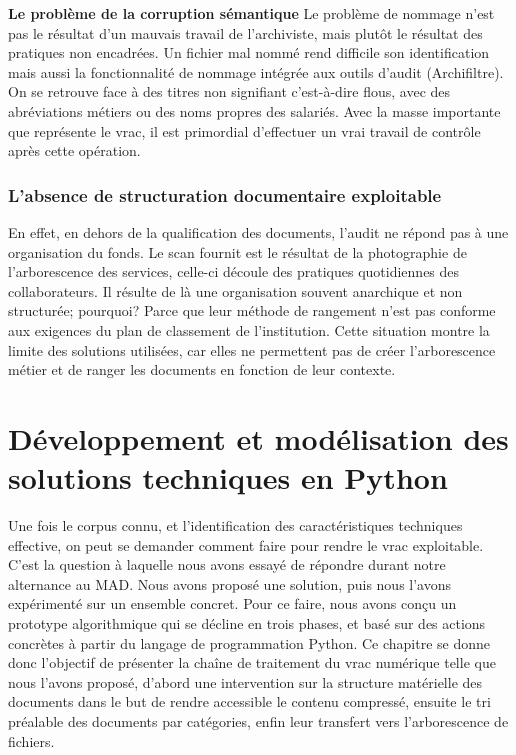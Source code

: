 \textbf{Le problème de la corruption sémantique}  Le problème de nommage n'est pas le résultat d'un mauvais travail de l'archiviste, mais plutôt le résultat des pratiques non encadrées. Un fichier mal nommé rend difficile son identification mais aussi la fonctionnalité de nommage intégrée aux outils d'audit (Archifiltre). On se retrouve face à des titres non signifiant c'est-à-dire flous, avec des abréviations métiers ou des noms propres des salariés. Avec la masse importante que représente le vrac, il est primordial d'effectuer un vrai travail de contrôle après cette opération. 


\subsection*{L’absence de structuration documentaire exploitable}

En effet, en dehors de la qualification des documents, l'audit ne répond pas à une organisation du fonds. Le scan fournit est le résultat de la photographie de l'arborescence des services, celle-ci découle des pratiques quotidiennes des collaborateurs. Il résulte de là une organisation souvent anarchique et non structurée; pourquoi? Parce que leur méthode de rangement n'est pas conforme aux exigences du plan de classement de l'institution. Cette situation montre la limite des solutions utilisées, car elles ne permettent pas de créer l'arborescence métier et de ranger les documents en fonction de leur contexte.



\chapter{Développement et modélisation des solutions techniques en Python}

Une fois le corpus connu, et l'identification des caractéristiques techniques effective, on peut se demander comment faire pour rendre le vrac exploitable. C'est la question à laquelle nous avons essayé de répondre durant notre alternance au MAD. Nous avons proposé une solution, puis nous l'avons expérimenté sur un ensemble concret. Pour ce faire, nous avons conçu un prototype algorithmique qui se décline en trois phases, et basé sur des actions concrètes à partir du langage de programmation Python. 
Ce chapitre se donne donc l'objectif de présenter la chaîne de traitement du vrac numérique telle que nous l'avons proposé, d'abord une intervention sur la structure matérielle des documents dans le but de rendre accessible le contenu compressé, ensuite le tri préalable des documents par catégories, enfin leur transfert vers l'arborescence de  fichiers.

